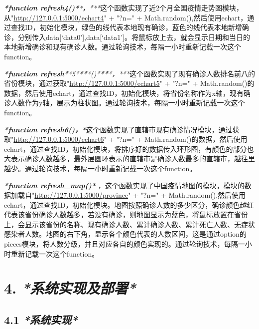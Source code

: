 \documentclass[
]{article}
\begin{document}
\emph{\textbf{*function
refresh4()*}\textbf{}*，***}这个函数实现了近2个月全国疫情走势图模块，
从"\url{http://127.0.0.1:5000/echart4}" + "?n=" +
Math.random(),然后使用echart，通过查找ID，初始化模块，绿色的线代表本地现有确诊，蓝色的线代表本地新增确诊，分别传入data{[}`data0'{]},data{[}`data1'{]}。将鼠标放上去，就会显示日期和当日的本地新增确诊和现有确诊人数。通过轮询技术，每隔一小时重新记载一次这个function。

\emph{\textbf{*function
refresh*}\textbf{}*5*\textbf{**}*()*\textbf{**}*，***}这个函数实现了现有确诊人数排名前八的省份模块，通过获取"\url{http://127.0.0.1:5000/echart5}"
+ "?n=" +
Math.random()的数据，然后使用echart，通过查找ID，初始化模块，将省份名称作为x轴，现有确诊人数作为y轴，展示为柱状图。通过轮询技术，每隔一小时重新记载一次这个function。

\emph{\textbf{*function
refresh6()，*}}这个函数实现了直辖市现有确诊情况模块，通过获取"\url{http://127.0.0.1:5000/echart6}"
+ "?n=" +
Math.random()的数据，然后使用echart，通过查找ID，初始化模块，将排序好的数据传入环形图，有颜色的部分也大表示确诊人数越多，最外层圆环表示的直辖市是确诊人数最多的直辖市，越往里越少。通过轮询技术，每隔一小时重新记载一次这个function。

\emph{\textbf{*function refresh\_map()*}}
，这个函数实现了中国疫情地图的模块，模块的数据加载自"\url{http://127.0.0.1:5000/province}"
+ "?n=" +
Math.random(),然后使用echart，通过查找ID，初始化模块。地图按照确诊人数的多少区分，确诊颜色越红代表该省份确诊人数越多，若没有确诊，则地图显示为蓝色，将鼠标放置在省份上，会显示该省份的名称、现有确诊人数、累计确诊人数、累计死亡人数、无症状感染者人数。地图的右下角，显示各个颜色代表的人数区间，这是通过option的pieces模块，将人数分级，并且对应各自的颜色实现的。通过轮询技术，每隔一小时重新记载一次这个function。

\hypertarget{4-ux7cfbux7edfux5b9eux73b0ux53caux90e8ux7f72}{%
\section{\texorpdfstring{\textbf{4.}
\emph{\textbf{*系统实现及部署*}}}{4. *系统实现及部署*}}\label{4-ux7cfbux7edfux5b9eux73b0ux53caux90e8ux7f72}}

\hypertarget{41-ux7cfbux7edfux5b9eux73b0}{%
\subsection{\texorpdfstring{\textbf{4.1}
\emph{\textbf{*系统实现*}}}{4.1 *系统实现*}}\label{41-ux7cfbux7edfux5b9eux73b0}}
\end{document}
